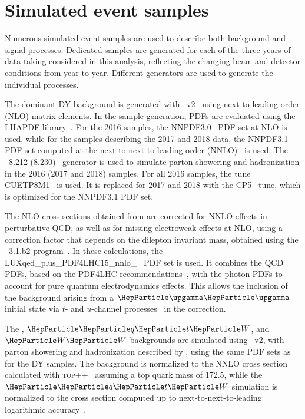 \documentclass[11pt,twoside,a4paper,cmspaper,final,collab]{cms-tdr}
\begin{document}
\section{Simulated event samples}
\label{sec:samples}
Numerous simulated event samples are used to describe both background and signal processes. Dedicated samples are generated for each of the three years of data taking considered in this analysis, reflecting the changing beam and detector conditions from year to year. Different generators are used to generate the individual processes.

The dominant DY background is generated with  \POWHEG~v2~\cite{Nason:2004rx,Frixione:2007vw,Alioli:2010xd,Alioli:2008gx,Frixione:2007nw,Re:2010bp} using next-to-leading order (NLO) matrix elements. In the sample generation, PDFs are evaluated using the LHAPDF library~\cite{Whalley:2005nh,Bourilkov:2006cj,Buckley:2014ana}. For the 2016 samples, the NNPDF3.0~\cite{Ball:2014uwa} PDF set at NLO is used, while for the samples describing the 2017 and 2018 data, the NNPDF3.1 PDF set computed at the next-to-next-to-leading order (NNLO)~\cite{Ball:2017nwa} is used. The \PYTHIA~8.212 (8.230)~\cite{Sjostrand:2014zea} generator is used to simulate parton showering and hadronization in the 2016 (2017 and 2018) samples. For all 2016 samples, the \PYTHIA tune CUETP8M1~\cite{Khachatryan:2015pea} is used. It is replaced for 2017 and 2018 with the CP5~\cite{Sirunyan:2019dfx} tune, which is optimized for the NNPDF3.1 PDF set. 

 The NLO cross sections obtained from \POWHEG are corrected for NNLO effects in perturbative QCD, as well as for missing electroweak effects at NLO, using a correction factor that depends on the dilepton invariant mass, obtained using the \FEWZ~3.1.b2 program~\cite{Li:2012wna}. In these calculations, the LUXqed\_\-plus\_\-PDF4LHC15\_\-nnlo\_~\cite{Manohar:2016nzj} PDF set is used. It combines the QCD PDFs, based on the PDF4LHC recommendations~\cite{Butterworth:2015oua}, with the photon PDFs to account for pure quantum electrodynamics effects. This allows the inclusion of the background arising from a $\PGg\PGg$ initial state via $t$- and $u$-channel processes~\cite{Bourilkov:2016qum,Bourilkov:2016oet} in the correction.
  
The \ttbar, $\PQqt\PW$, and $\PW\PW$ backgrounds are simulated using \POWHEG~v2, with parton showering and hadronization described by \PYTHIA, using the same PDF sets as for the DY samples. The \ttbar background is normalized to the NNLO cross section calculated with \textsc{top++}~\cite{Czakon:2011xx} assuming a top quark mass of 172.5\GeV, 
while the $\PQqt\PW$ simulation is normalized to the cross section computed up to next-to-next-to-leading logarithmic accuracy~\cite{Kidonakis:2010ux}.
\end{document}
